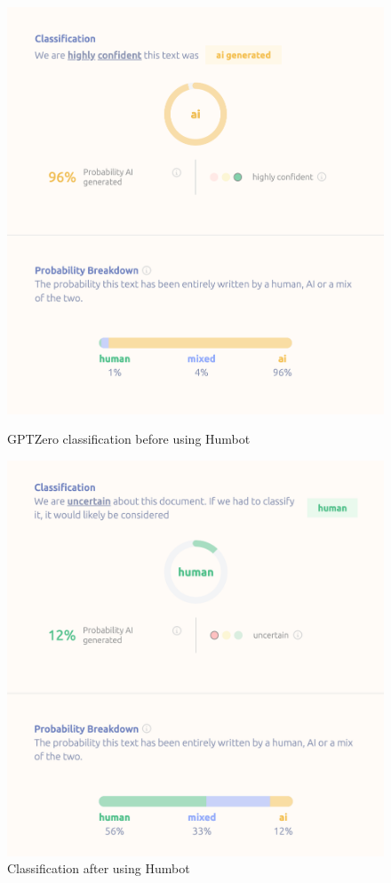 \documentclass[12pt,a4paper]{article}
\begin{document}
\begin{figure}[h]
    \centering
    \begin{minipage}{0.45\textwidth}
        \centering
        \includegraphics[width=\textwidth]{humbot2.png}
        \caption{GPTZero classification before using Humbot}
    \end{minipage}\hfill
    \begin{minipage}{0.45\textwidth}
        \centering
        \includegraphics[width=\textwidth]{humbot1.png}
        \caption{Classification after using Humbot}
        \label{fig:humbotFig}
    \end{minipage}
\end{figure}
\end{document}
